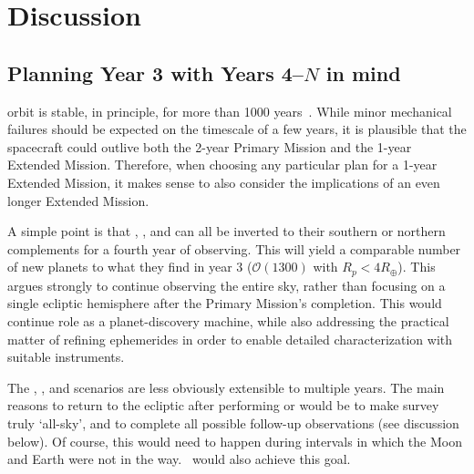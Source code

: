 \section{Discussion} 
\label{sec:discussion}

\subsection{Planning Year 3 with Years 4--$N$ in mind}
\label{sec:gtr_1yr_horizon}

\tesss orbit is stable, in principle, for more than 1000 years~\citep{gangestad_high_2013}.
While minor mechanical failures should be expected on the timescale of a few years, it is plausible that the spacecraft could outlive both the 2-year Primary Mission and the 1-year Extended Mission.
Therefore, when choosing any particular plan for a 1-year Extended Mission, it makes
sense to also consider the implications of an even longer Extended Mission.

A simple point is that \nhemi, \npole, and \shemiAvoid\:can all be inverted to their southern or northern complements for a fourth year of observing.
This will yield a comparable number of new planets to what they find in year 3 ($\mathcal{O}(1300)$ with $R_p<4R_\oplus$).
This argues strongly to continue observing the entire sky, rather than focusing on a single ecliptic hemisphere after the Primary Mission's completion.
This would continue \tesss role as a planet-discovery machine, while also addressing the practical matter of refining ephemerides in order to enable detailed characterization with suitable instruments.

The \elong, \eshort, and \hemis\:scenarios are less obviously extensible to multiple years.
The main reasons to return to the ecliptic after performing \elong\:or 
\eshort\:would be to make \tesss survey truly `all-sky', and to complete all 
possible \ktwo follow-up observations (see discussion below).
Of course, this would need to happen during intervals in which the Moon and 
Earth were not in the way.
\shemiAvoid\ would also achieve this goal.

